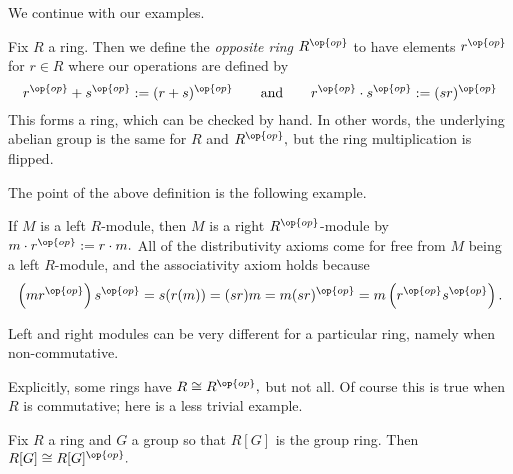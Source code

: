 \documentclass[../notes.tex]{subfiles}
\begin{document}
We continue with our examples.
\begin{definition}
	Fix $R$ a ring. Then we define the \textit{opposite ring} $R^{\op{op}}$ to have elements $r^{\op{op}}$ for $r\in R$ where our operations are defined by
	\[r^{\op{op}}+s^{\op{op}}:=(r+s)^{\op{op}}\qquad\text{and}\qquad r^{\op{op}}\cdot s^{\op{op}}:=(sr)^{\op{op}}\]
	This forms a ring, which can be checked by hand. In other words, the underlying abelian group is the same for $R$ and $R^{\op{op}},$ but the ring multiplication is flipped.
\end{definition}
The point of the above definition is the following example.
\begin{example}
	If $M$ is a left $R$-module, then $M$ is a right $R^{\op{op}}$-module by $m\cdot r^{\op{op}}:=r\cdot m.$ All of the distributivity axioms come for free from $M$ being a left $R$-module, and the associativity axiom holds because
	\[\left(mr^{\op{op}}\right)s^{\op{op}}=s(r(m))=(sr)m=m(sr)^{\op{op}}=m\left(r^{\op{op}}s^{\op{op}}\right).\]
\end{example}
\begin{warn}
	Left and right modules can be very different for a particular ring, namely when non-commutative.
\end{warn}
Explicitly, some rings have $R\cong R^{\op{op}},$ but not all. Of course this is true when $R$ is commutative; here is a less trivial example.
\begin{proposition}
	Fix $R$ a ring and $G$ a group so that $R[G]$ is the group ring. Then $R[G]\cong R[G]^{\op{op}}.$
\end{proposition}
\end{document}

